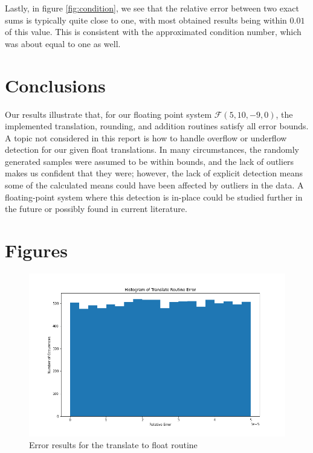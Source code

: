 \documentclass[11pt]{article}
\begin{document}
Lastly, in figure \ref{fig:condition}, we see that the relative error between two exact sums is typically quite close to one, with most obtained results being within $0.01$ of this value. This is consistent with the approximated condition number, which was about equal to one as well.

\section{Conclusions}

Our results illustrate that, for our floating point system $\mathcal{F}(5, 10, -9, 0)$, the implemented translation, rounding, and addition routines satisfy all error bounds. A topic not considered in this report is how to handle overflow or underflow detection for our given float translations. In many circumstances, the randomly generated samples were assumed to be within bounds, and the lack of outliers makes us confident that they were; however, the lack of explicit detection means some of the calculated means could have been affected by outliers in the data. A floating-point system where this detection is in-place could be studied further in the future or possibly found in current literature.


\section{Figures}
\begin{figure}[h!]
	\centering
	\includegraphics[width=\linewidth]{../figures/Translation Histogram}
	\caption{Error results for the translate to float routine}
	\label{fig:translate}
\end{figure}
\end{document}
